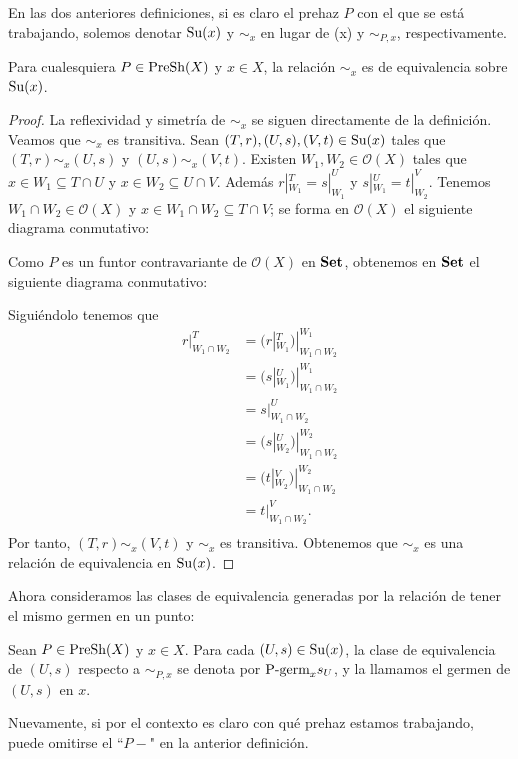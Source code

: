 En las dos anteriores definiciones, si es claro el prehaz $P$ con el que se está trabajando, solemos denotar $\normalfont{\text{Su}}(x)$ y $\sim_{x}$ en lugar de \PSu(x) y $\sim_{P,x}$, respectivamente.
\begin{Prop}
   Para cualesquiera $P\in\normalfont{\text{PreSh}}(X)$ y $x\in X$, la relación $\sim_{x}$ es de equivalencia sobre $\normalfont{\text{Su}}(x)$.
\end{Prop}
\begin{proof}
   La reflexividad y simetría de $\sim_{x}$ se siguen directamente de la definición. Veamos que $\sim_{x}$ es transitiva. Sean $(T,r),(U,s),(V,t)\in\normalfont{\text{Su}}(x)$ tales que $(T,r)\sim_{x}(U,s)$ y $(U,s)\sim_{x}(V,t)$. Existen $W_1,W_2\in\mathcal{O}(X)$ tales que $x\in W_1\subseteq T\cap U$ y $x\in W_2\subseteq U\cap V$. Además $r|^{T}_{W_1}=s|^{U}_{W_1}$ y $s|^{U}_{W_1}=t|^{V}_{W_2}$. Tenemos $W_1\cap W_2\in\mathcal{O}(X)$ y $x\in W_1\cap W_2\subseteq T\cap V$; se forma en $\mathcal{O}(X)$ el siguiente diagrama conmutativo:
   
   
   Como $P$ es un funtor contravariante de $\mathcal{O}(X)$ en $\normalfont{\textbf{Set}}$, obtenemos en $\normalfont{\textbf{Set}}$ el siguiente diagrama conmutativo:
   
   Siguiéndolo tenemos que
   $$
   \begin{aligned}
      r|^{T}_{W_1\cap W_2}&=(r|^{T}_{W_1})|^{W_1}_{W_1\cap W_2}\\
                          &=(s|^{U}_{W_1})|^{W_1}_{W_1\cap W_2}\\
                          &=s|^{U}_{W_1\cap W_2}\\
                          &=(s|^{U}_{W_2})|^{W_2}_{W_1\cap W_2}\\
                          &=(t|^{V}_{W_2})|^{W_2}_{W_1\cap W_2}\\
                          &=t|^{V}_{W_1\cap W_2}.\\
   \end{aligned}
   $$
   Por tanto, $(T,r)\sim_{x} (V,t)$ y $\sim_{x}$ es transitiva. Obtenemos que $\sim_{x}$ es una relación de equivalencia en $\normalfont{\text{Su}}(x)$.
\end{proof}
Ahora consideramos las clases de equivalencia generadas por la relación de tener el mismo germen en un punto:
\begin{Def}
   Sean $P\in \normalfont{\text{PreSh}}(X)$ y $x\in X$. Para cada $(U,s)\in \normalfont{\text{Su}}(x)$, la clase de equivalencia de $(U,s)$ respecto a $\sim_{P,x}$ se denota por $\normalfont{\text{P-germ}}_{x}s_{U}$, y la llamamos el germen de $(U,s)$ en $x$.
\end{Def}
Nuevamente, si por el contexto es claro con qué prehaz estamos trabajando, puede omitirse el ``$P-$" en la anterior definición.

